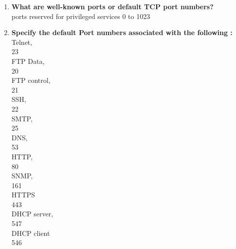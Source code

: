 \documentclass[a4paper,12pt]{article}
\begin{document}
\begin{flushleft}
\begin{enumerate}
{INTERNET domain- two processes running on any two hosts on the internet communicate}\\
 b) Address format \\
 {\color{red}address domain has its own address format, unix domain has format as character string; an entery in the file system\\
 internet domain has address format as IP address}\\
c) Port Number\\
{\color{red}16 bit unsigned integer}\\
 d) Socket types\\
{\color{red}stream socket-communication as continuous stream of characters\\datafram socket-reat entire messages at once}\\
\item \textbf{ What are well-known ports or default TCP port numbers?}\\
{\color{red}ports reserved for privileged services 0 to 1023}\\
\item \textbf{ Specify the default Port numbers associated with the following :}\\
Telnet,\\
{\color{red}23}\\
 FTP Data,\\
 {\color{red}20}\\
 FTP control,\\
 {\color{red}21}\\
 SSH,\\
 {\color{red}22}\\
 SMTP,\\
 {\color{red}25}\\
 DNS,\\
 {\color{red}53}\\
 HTTP,\\
 {\color{red}80}\\
 SNMP,\\
 {\color{red}161}\\
 HTTPS\\
 {\color{red}443}\\
  DHCP server,\\
 {\color{red}547}\\
 DHCP client\\
 {\color{red}546}\\


\end{enumerate}
\end{flushleft}
\end{document}
